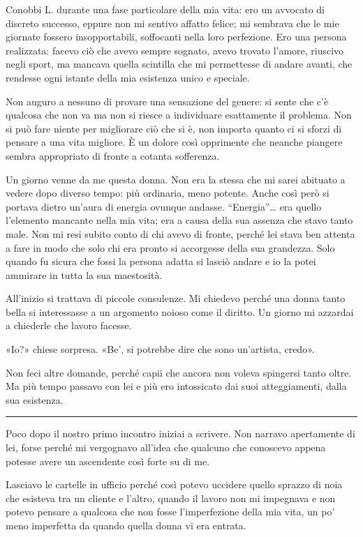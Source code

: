 \documentclass[a4paper,10pt]{memoir}
\begin{document}
Conobbi L. durante una fase particolare della mia vita: ero un avvocato di discreto successo, eppure non mi sentivo
affatto felice; mi sembrava che le mie giornate fossero insopportabili, soffocanti nella loro perfezione. Ero una
persona realizzata: facevo ciò che avevo sempre sognato, avevo trovato l'amore, riuscivo negli sport, ma mancava quella
scintilla che mi permettesse di andare avanti, che rendesse ogni istante della mia esistenza unico e speciale.

Non auguro a nessuno di provare una sensazione del genere: si sente che c'è qualcosa che non va ma non si riesce a
individuare esattamente il problema. Non si può fare niente per migliorare ciò che si è, non importa quanto ci si sforzi
di pensare a una vita migliore. È un dolore così opprimente che neanche piangere sembra appropriato di fronte a cotanta
sofferenza.

Un giorno venne da me questa donna. Non era la stessa che mi sarei abituato a vedere dopo diverso tempo: più ordinaria,
meno potente. Anche così però si portava dietro un'aura di energia ovunque andasse. ``Energia''\dots{} era quello
l'elemento mancante nella mia vita; era a causa della sua assenza che stavo tanto male. Non mi resi subito conto di chi
avevo di fronte, perché lei stava ben attenta a fare in modo che solo chi era pronto si accorgesse della sua grandezza.
Solo quando fu sicura che fossi la persona adatta si lasciò andare e io la potei ammirare in tutta la sua maestosità.

All'inizio si trattava di piccole consulenze. Mi chiedevo perché una donna tanto bella si interessasse a un argomento
noioso come il diritto. Un giorno mi azzardai a chiederle che lavoro facesse.

«Io?» chiese sorpresa. «Be', si potrebbe dire che sono un'artista, credo».

Non feci altre domande, perché capii che ancora non voleva spingersi tanto oltre. Ma più tempo passavo con lei e più ero
intossicato dai suoi atteggiamenti, dalla sua esistenza.

\plainbreak{1}

Poco dopo il nostro primo incontro iniziai a scrivere. Non narravo apertamente di lei, forse perché mi vergognavo
all'idea che qualcuno che conoscevo appena potesse avere un ascendente così forte su di me.

Lasciavo le cartelle in ufficio perché così potevo uccidere quello sprazzo di noia che esisteva tra un cliente e
l'altro, quando il lavoro non mi impegnava e non potevo pensare a qualcosa che non fosse l'imperfezione della mia vita,
un po' meno imperfetta da quando quella donna vi era entrata.
\end{document}

